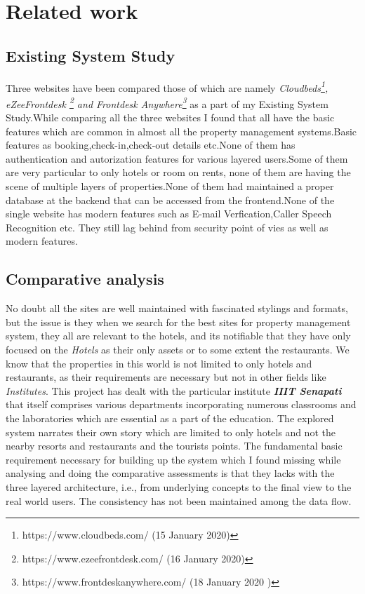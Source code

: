 \documentclass[12pt]{report}
\begin{document}
\chapter{Related work}
 
\section{Existing System Study}
Three websites have been compared those of which are namely \textit{Cloudbeds\footnote{https://www.cloudbeds.com/ (15 January 2020)}, eZeeFrontdesk \footnote{https://www.ezeefrontdesk.com/ (16 January 2020)} and
Frontdesk Anywhere\footnote{https://www.frontdeskanywhere.com/ (18 January 2020 )}} as a part of my Existing
System Study.While comparing all the three
websites I found that all have the basic features
which are common in almost all the property
management
systems.Basic
features
as
booking,check-in,check-out details etc.None of
them has authentication and autorization
features for various layered users.Some of them
are very particular to only hotels or room on
rents, none of them are having the scene of
multiple layers of properties.None of them had
maintained a proper database at the backend
that can be accessed from the frontend.None of
the single website has modern features such as
E-mail Verfication,Caller Speech Recognition
etc. They still lag behind from security point of
vies as well as modern features.
\section{Comparative analysis}
No doubt all the sites are well maintained with fascinated stylings and formats, but the issue is they when we search for the best sites for property management system, they all are relevant to the hotels, and its notifiable that they have only focused on the \textit{Hotels} as their only assets or to some extent the restaurants.  We know that the properties in this world is not limited to only hotels and restaurants, as their requirements are necessary but not in other fields like \textit{Institutes}. This project has dealt with the particular institute \textbf{\textit{IIIT Senapati}} that itself comprises various departments incorporating numerous classrooms and the laboratories which are essential as a part of the education. The explored system narrates their own story which are limited to only hotels and not the nearby resorts and restaurants and the tourists points. \newline
The fundamental basic requirement necessary for building up the system which I found missing while analysing and doing the comparative assessments is that they lacks with the three layered architecture, i.e., from underlying concepts to the final view to the real world users. The consistency has not been maintained among the data flow. 
\end{document}
